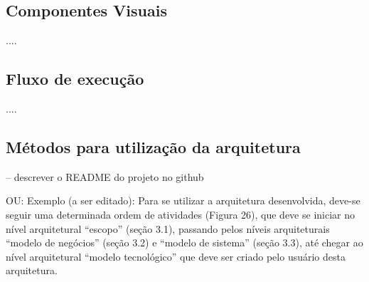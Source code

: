 \subsection{Componentes Visuais}\label{sec:solucao-desenvolvida}
....


\subsection{Fluxo de execução}\label{sec:solucao-desenvolvida}
....


\subsection{Métodos para utilização da arquitetura}
-- descrever o README do projeto no github

OU:
Exemplo (a ser editado): Para se utilizar a arquitetura desenvolvida, deve-se seguir uma determinada ordem de atividades (Figura 26), que deve se iniciar no nível arquitetural “escopo” (seção 3.1), passando pelos níveis arquiteturais “modelo de negócios” (seção 3.2) e “modelo de sistema” (seção 3.3), até chegar ao nível arquitetural “modelo tecnológico” que deve ser criado pelo usuário desta arquitetura.